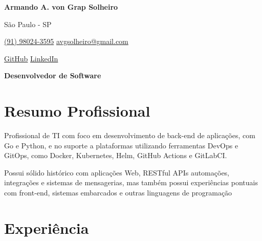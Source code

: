 \documentclass[a4paper,10pt]{article}
\begin{document}

\noindent
\begin{minipage}[t]{0.5\textwidth}
\textbf{\Large Armando A. von Grap Solheiro}

\vspace{0.4em}

\end{minipage}%
\begin{minipage}[t]{0.5\textwidth}
\raggedleft

São Paulo - SP

{\color{blue}} \href{tel:+5591980243595}{\faPhone \space (91) 98024-3595}
{\color{blue}} \href{mailto:avgsolheiro@gmail.com}{\faEnvelope \space avgsolheiro@gmail.com}

\vspace{0.2em}
 \quad
{\color{blue}} \href{https://github.com/asolheiro}{\faGithub \space GitHub} \quad
{\color{blue}} \href{https://www.linkedin.com/in/armandosolheiro/}{\faLinkedin \space LinkedIn} \\
\end{minipage}

\vspace{1em}

\begin{center}
    \textbf{\Large Desenvolvedor de Software}
\end{center}
\vspace{0.5em}

\section*{Resumo Profissional}

Profissional de TI com foco em desenvolvimento de back-end de aplicações, com Go e Python, e no suporte a plataformas utilizando ferramentas DevOps e GitOps, como Docker, Kubernetes, Helm,  GitHub Actions e GitLabCI.

Possui sólido histórico com aplicações Web, RESTful APIs automações, integrações e sistemas de mensagerias, mas também possui experiências pontuais com front-end, sistemas embarcados e outras linguagens de programação



\vspace{0.6em}

\vspace{0.5em}

\section*{Experiência}
\end{document}
